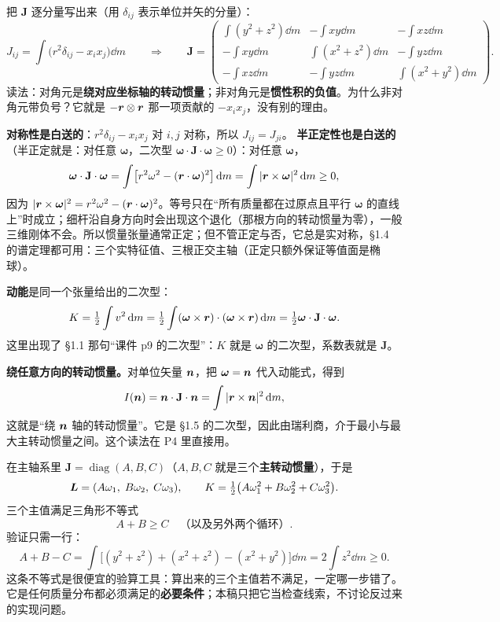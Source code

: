 \documentclass[11pt]{ctexart}
\newcommand{\ten}[1]{\mathbf{#1}}
\let\origsubhdr\subhdr
\renewcommand{\subhdr}[1]{\par\needspace{3\baselineskip}\origsubhdr{#1}}
\begin{document}
\label{subsec:inertia-components}

把 $\ten J$ 逐分量写出来（用 $\delta_{ij}$ 表示单位并矢的分量）：
\[
J_{ij}=\int\bigl(r^2\delta_{ij}-x_ix_j\bigr)\dd m
\qquad\Longrightarrow\qquad
\ten J=
\begin{pmatrix}
\int(y^2+z^2)\dd m & -\int xy\dd m & -\int xz\dd m\\[3pt]
-\int xy\dd m & \int(x^2+z^2)\dd m & -\int yz\dd m\\[3pt]
-\int xz\dd m & -\int yz\dd m & \int(x^2+y^2)\dd m
\end{pmatrix}.
\]
读法：对角元是\textbf{绕对应坐标轴的转动惯量}；非对角元是\textbf{惯性积的负值}。为什么非对角元带负号？它就是 $-\boldsymbol{r}\otimes\boldsymbol{r}$ 那一项贡献的 $-x_ix_j$，没有别的理由。

\textbf{对称性是白送的}：$r^2\delta_{ij}-x_ix_j$ 对 $i,j$ 对称，所以 $J_{ij}=J_{ji}$。
\textbf{半正定性也是白送的}（半正定就是：对任意 $\boldsymbol\omega$，二次型 $\boldsymbol\omega\cdot\ten J\cdot\boldsymbol\omega\ge0$）：对任意 $\boldsymbol\omega$，
\[
\boldsymbol\omega\cdot\ten J\cdot\boldsymbol\omega
=\int\bigl[r^2\omega^2-(\vect r\cdot\boldsymbol\omega)^2\bigr]\dd m
=\int|\vect r\times\boldsymbol\omega|^2\dd m\ge0,
\]
因为 $|\boldsymbol{r}\times\boldsymbol\omega|^2=r^2\omega^2-(\boldsymbol{r}\cdot\boldsymbol\omega)^2$。等号只在“所有质量都在过原点且平行 $\boldsymbol\omega$ 的直线上”时成立；细杆沿自身方向时会出现这个退化（那根方向的转动惯量为零），一般三维刚体不会。所以惯量张量通常正定；但不管正定与否，它总是实对称，\S1.4 的谱定理都可用：三个实特征值、三根正交主轴（正定只额外保证等值面是椭球）。

\textbf{动能}是同一个张量给出的二次型：
\[
K=\tfrac12\int v^2\dd m
=\tfrac12\int(\boldsymbol\omega\times\vect r)\cdot(\boldsymbol\omega\times\vect r)\dd m
=\tfrac12\boldsymbol\omega\cdot\ten J\cdot\boldsymbol\omega .
\]
这里出现了 \S1.1 那句“课件 p9 的二次型”：$K$ 就是 $\boldsymbol\omega$ 的二次型，系数表就是 $\ten J$。

\textbf{绕任意方向的转动惯量。}对单位矢量 $\boldsymbol{n}$，把 $\boldsymbol\omega=\boldsymbol{n}$ 代入动能式，得到
\[
I(\vect n)=\vect n\cdot\ten J\cdot\vect n=\int|\vect r\times\vect n|^2\dd m,
\]
这就是“绕 $\boldsymbol{n}$ 轴的转动惯量”。它是 \S1.5 的二次型，因此由瑞利商，介于最小与最大主转动惯量之间。这个读法在 P4 里直接用。

\label{subsec:principal}

在主轴系里 $\ten J=\operatorname{diag}(A,B,C)$（$A,B,C$ 就是三个\textbf{主转动惯量}），于是
\[
\boldsymbol{L}=(A\omega_1,\;B\omega_2,\;C\omega_3),
\qquad
K=\tfrac12\bigl(A\omega_1^2+B\omega_2^2+C\omega_3^2\bigr).
\]
三个主值满足三角形不等式
\[
A+B\ge C\quad\text{（以及另外两个循环）}.
\]
验证只需一行：
\[
A+B-C=\int\bigl[(y^2+z^2)+(x^2+z^2)-(x^2+y^2)\bigr]\dd m=2\int z^2\dd m\ge0 .
\]
这条不等式是很便宜的验算工具：算出来的三个主值若不满足，一定哪一步错了。它是任何质量分布都必须满足的\textbf{必要条件}；本稿只把它当检查线索，不讨论反过来的实现问题。
\end{document}
